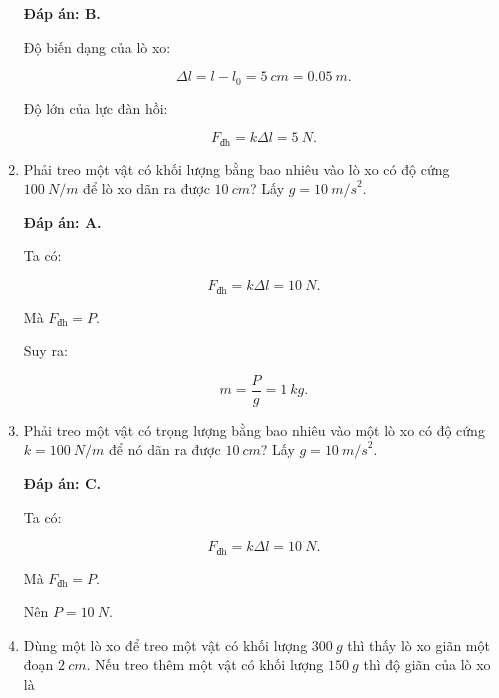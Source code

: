 \begin{enumerate}[label=\bfseries Câu \arabic*:]
	\hideall
	{	
		\textbf{Đáp án: B.}
		
		Độ biến dạng của lò xo:
		
		$$\Delta l = l-l_0 = \SI{5}{cm} = \SI{0,05}{m}.$$
		
		Độ lớn của lực đàn hồi:
		
		$$F_\text{đh} = k\Delta l = \SI{5}{N}.$$
		
	}
	\item {}
	
	
	{
		Phải treo một vật có khối lượng bằng bao nhiêu vào lò xo có độ cứng $\SI{100}{N/m}$ để lò xo dãn ra được $\SI{10}{cm}$? Lấy $g = \SI{10}{m/s}^2$. 
	}
	
	\hideall
	{	
		\textbf{Đáp án: A.}
		
		Ta có: 
		
		$$F_\text{đh} = k\Delta l = \SI{10}{N}.$$
		
		Mà $F_\text{đh} = P.$
		
		Suy ra:
		
		$$m = \dfrac{P}{g} = \SI{1}{kg}.$$
		
		
	}
		\item {}
	
	
	{
		Phải treo một vật có trọng lượng bằng bao nhiêu vào một lò xo có độ cứng $k = \SI{100}{N/m}$ để nó dãn ra được $\SI{10}{cm}$? Lấy $g = \SI{10}{m/s}^2$.
	}
	
	\hideall
	{	
		\textbf{Đáp án: C.}
		
		Ta có: 
		
		$$F_\text{đh} = k\Delta l = \SI{10}{N}.$$
		
		Mà $F_\text{đh} = P.$
		
		Nên $P = \SI{10}{N}.$
	}
	\item {}
	
	
	{
		Dùng một lò xo để treo một vật có khối lượng $\SI{300}{g}$ thì thấy lò xo giãn một đoạn $\SI{2}{cm}$. Nếu treo thêm một vật có khối lượng $\SI{150}{g}$ thì độ giãn của lò xo là
	}
	

\end{enumerate}

